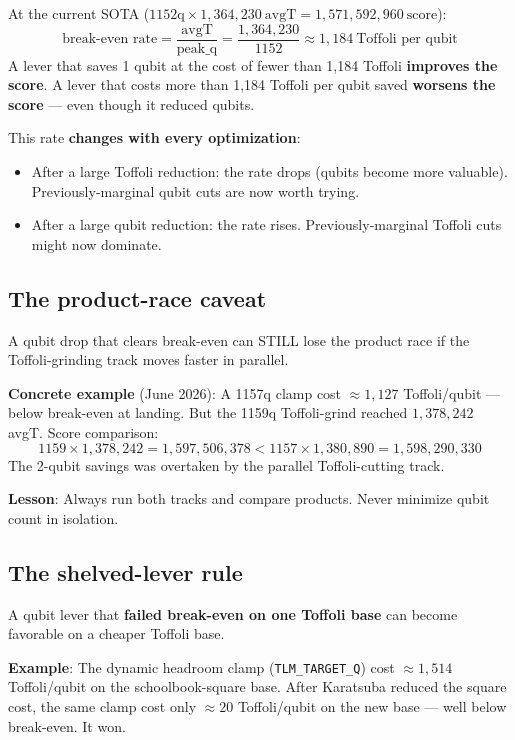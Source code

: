 \documentclass[11pt,a4paper]{article}
\begin{document}
At the current SOTA ($1152\text{q} \times 1{,}364{,}230\ \text{avgT} = 1{,}571{,}592{,}960\ \text{score}$):
\[
  \text{break-even rate} = \frac{\text{avgT}}{\text{peak\_q}} = \frac{1{,}364{,}230}{1152} \approx 1{,}184\ \text{Toffoli per qubit}
\]
A lever that saves 1 qubit at the cost of fewer than 1,184 Toffoli \textbf{improves the score}.
A lever that costs more than 1,184 Toffoli per qubit saved \textbf{worsens the score} --- even
though it reduced qubits.

This rate \textbf{changes with every optimization}:
\begin{itemize}
  \item After a large Toffoli reduction: the rate drops (qubits become more valuable). Previously-marginal qubit cuts are now worth trying.
  \item After a large qubit reduction: the rate rises. Previously-marginal Toffoli cuts might now dominate.
\end{itemize}

\subsection{The product-race caveat}

A qubit drop that clears break-even can STILL lose the product race if the Toffoli-grinding
track moves faster in parallel.

\textbf{Concrete example} (June 2026):
A 1157q clamp cost $\approx1{,}127$ Toffoli/qubit --- below break-even at landing. But the 1159q
Toffoli-grind reached $1{,}378{,}242$ avgT. Score comparison:
\[
  1159 \times 1{,}378{,}242 = 1{,}597{,}506{,}378 < 1157 \times 1{,}380{,}890 = 1{,}598{,}290{,}330
\]
The 2-qubit savings was overtaken by the parallel Toffoli-cutting track.

\textbf{Lesson}: Always run both tracks and compare products. Never minimize qubit count in isolation.

\subsection{The shelved-lever rule}

A qubit lever that \textbf{failed break-even on one Toffoli base} can become favorable on a
cheaper Toffoli base.

\textbf{Example}: The dynamic headroom clamp (\texttt{TLM\_TARGET\_Q}) cost $\approx1{,}514$
Toffoli/qubit on the schoolbook-square base. After Karatsuba reduced the square cost, the same
clamp cost only $\approx20$ Toffoli/qubit on the new base --- well below break-even. It won.
\end{document}
